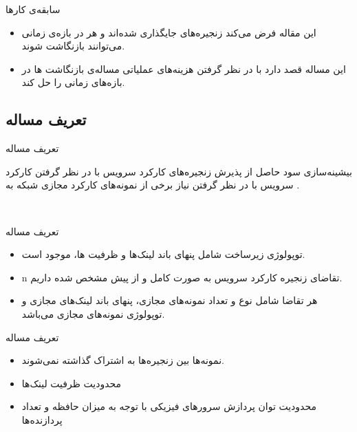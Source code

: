 \documentclass{beamer}
\makeatletter
\newcommand{\RTList}{\raggedleft\rightskip\@totalleftmargin}
\makeatother
\begin{document}
\begin{persian}
\begin{frame}{سابقه‌ی کارها}
\begin{itemize}
        \item این مقاله فرض می‌کند زنجیره‌های جایگذاری شده‌اند و هر در بازه‌ی زمانی می‌توانند بازنگاشت شوند.
        \item این مساله قصد دارد با در نظر گرفتن هزینه‌های عملیاتی مساله‌ی بازنگاشت ها در بازه‌های زمانی را حل کند.
    \end{itemize}
    \begin{latin}
    \end{latin}
\end{frame}
\begin{frame}{}
    \section{تعریف مساله}
\end{frame}
\begin{frame}{تعریف مساله}
    \par
    بیشینه‌سازی سود حاصل از پذیرش زنجیره‌های کارکرد سرویس با در نظر گرفتن کارکرد سرویس با در نظر گرفتن نیاز برخی از نمونه‌های کارکرد
    مجازی شبکه به .
\end{frame}‌
\begin{frame}{تعریف مساله}
    \begin{itemize}\RTList{}
        \justifying
        \item توپولوژی زیرساخت شامل پنهای باند لینک‌ها و ظرفیت ها، موجود است.
        \item n تقاضای زنجیره‌ کارکرد سرویس به صورت کامل و از پیش مشخص شده داریم.
        \item هر تقاضا شامل نوع و تعداد نمونه‌های مجازی، پنهای باند لینک‌های مجازی و توپولوژی
        نمونه‌های مجازی می‌باشد.
    \end{itemize}
\end{frame}
\begin{frame}{تعریف مساله}
    \justifying
    \begin{itemize}\RTList{}
        \item نمونه‌ها بین زنجیره‌ها به اشتراک گذاشته نمی‌شوند.
        \item محدودیت ظرفیت لینک‌ها
        \item محدودیت توان پردازش سرورهای فیزیکی با توجه به میزان حافظه و تعداد پردازنده‌ها

\end{itemize}
\end{frame}
\end{persian}
\end{document}
